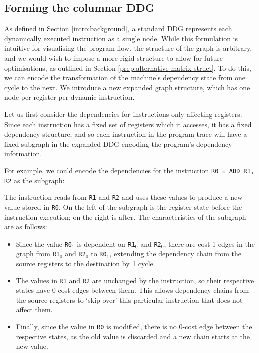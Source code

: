 \subsection{Forming the columnar DDG} \label{prep:register-only-chains}

As defined in Section \ref{intro:background}, a standard DDG represents 
each dynamically executed instruction as a single node. While this formulation is intuitive for visualising the program 
flow, the structure of the graph is arbitrary, and we would wish to impose a more rigid structure to allow for future
optimisations, as outlined in Section \ref{prep:alternative-matrix-struct}.
To do this, we can encode the transformation of the machine's dependency state from one cycle to the next.
We introduce a new expanded graph structure, which has one node per register per dynamic instruction.

Let us first consider the dependencies for instructions only affecting registers.
Since each instruction has a fixed set of registers which it accesses, it has a fixed dependency structure, and so each 
instruction in the program trace will have a fixed subgraph in the expanded DDG encoding the program's dependency information.

For example, we could encode the dependencies for the instruction \verb|R0 = ADD R1, R2| as the subgraph:

\begin{center}
  
\end{center}

The instruction reads from \verb|R1| and \verb|R2| and uses these values to produce a new value stored in \verb|R0|.
On the left of the subgraph is the register state before the instruction execution; on the right is after. The 
characteristics of the subgraph are as follows:
\begin{itemize}
  \item Since the value \verb|R0|$_1$ is dependent on \verb|R1|$_0$ and \verb|R2|$_0$, there are cost-1 edges in the graph 
    from \verb|R1|$_0$ and \verb|R2|$_0$ to \verb|R0|$_1$, extending the dependency chain from the source registers to the 
    destination by 1 cycle.

  \item The values in \verb|R1| and \verb|R2| are unchanged by the instruction, so their respective states have 0-cost 
    edges between them. This allows dependency chains from the source registers to `skip over' this particular instruction 
    that does not affect them.

  \item Finally, since the value in \verb|R0| is modified, there is no 0-cost edge between the respective states, as the 
    old value is discarded and a new chain starts at the new value.
\end{itemize}


